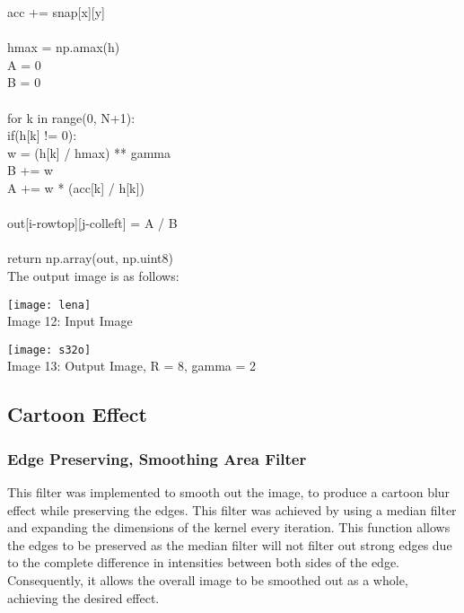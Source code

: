 \documentclass{article}
\begin{document}
	\indent \indent \indent \indent \indent acc += snap[x][y]\\
	\\
	\indent \indent \indent h\textunderscore max = np.amax(h)\\
	\indent \indent \indent A = 0 \\
	\indent \indent \indent B = 0 \\
	\\
	\indent \indent \indent for k in range(0, N+1):\\
	\indent \indent \indent \indent if(h[k] != 0):\\
	\indent \indent \indent \indent \indent w = (h[k] / h\textunderscore max) ** gamma\\
	\indent \indent \indent \indent \indent B += w\\
	\indent \indent \indent \indent \indent A += w * (acc[k] / h[k])\\
	\\
	\indent \indent \indent out[i-row\textunderscore top][j-col\textunderscore left] = A / B\\
	\\
	\indent return np.array(out, np.uint8)\\
	
	The output image is as follows:\\
	
	\begin{center}
		
		\texttt{[image: lena]}\\
		Image 12: Input Image 
		
		\texttt{[image: s32o]}\\
		Image 13: Output Image, R = 8, gamma = 2
		
	\end{center}
	
	\subsection{Cartoon Effect}
	
	\subsubsection{Edge Preserving, Smoothing Area Filter}
	
	This filter was implemented to smooth out the image, to produce a cartoon blur effect while preserving the edges. This filter was achieved by using a median filter and expanding the dimensions of the kernel every iteration. This function allows the edges to be preserved as the median filter will not filter out strong edges due to the complete difference in intensities between both sides of the edge. Consequently, it allows the overall image to be smoothed out as a whole, achieving the desired effect.\\
	
\end{document}
